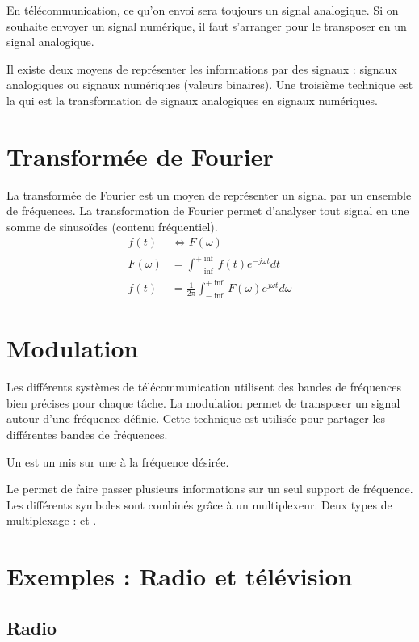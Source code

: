 En télécommunication, ce qu'on envoi sera toujours un signal analogique. Si on souhaite envoyer un signal numérique, il faut s'arranger pour le transposer en un signal analogique.

Il existe deux moyens de représenter les informations par des signaux : signaux analogiques ou signaux numériques (valeurs binaires). Une troisième technique est la  qui est la transformation de signaux analogiques en signaux numériques.

\section{Transformée de Fourier}

La transformée de Fourier est un moyen de représenter un signal par un ensemble de fréquences. La transformation de Fourier permet d'analyser tout signal en une somme de sinusoïdes (contenu fréquentiel).
\begin{align*} 
f(t) &\Leftrightarrow F(\omega)\\
F(\omega) &= \int_{-\inf}^{+\inf} f(t) e^{-j \omega t} dt\\
f(t) &= \frac{1}{2 \pi} \int_{-\inf}^{+\inf} F(\omega) e^{j \omega t} d\omega
\end{align*} 

\section{Modulation}
Les différents systèmes de télécommunication utilisent des bandes de fréquences bien précises pour chaque tâche.
La modulation permet de transposer un signal autour d'une fréquence définie. Cette technique est utilisée pour partager les différentes bandes de fréquences.

Un  est un  mis sur une  à la fréquence désirée.

Le  permet de faire passer plusieurs informations sur un seul support de fréquence. Les différents symboles sont combinés grâce à un multiplexeur. Deux types de multiplexage :  et .

\section{Exemples : Radio et télévision}

\subsection{Radio}


